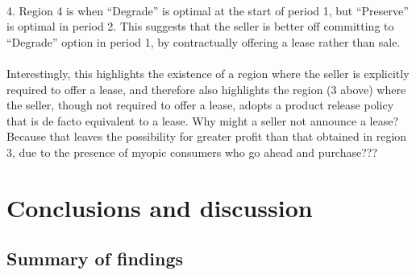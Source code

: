 \documentclass{article}
\begin{document}
\\
4. Region 4 is when {``}Degrade{''} is optimal at the start of period 1, but {``}Preserve{''} is optimal in period 2. This suggests that the seller
is better off committing to {``}Degrade{''} option in period 1, by contractually offering a lease rather than sale. \\
\\
Interestingly, this highlights the existence of a region where the seller is explicitly required to offer a lease, and therefore also highlights
the region (3 above) where the seller, though not required to offer a lease, adopts a product release policy that is de facto equivalent to a lease.
Why might a seller not announce a lease? Because that leaves the possibility for greater profit than that obtained in region 3, due to the presence
of myopic consumers who go ahead and purchase???

\section*{Conclusions and discussion }

\subsection*{Summary of findings}
\end{document}
